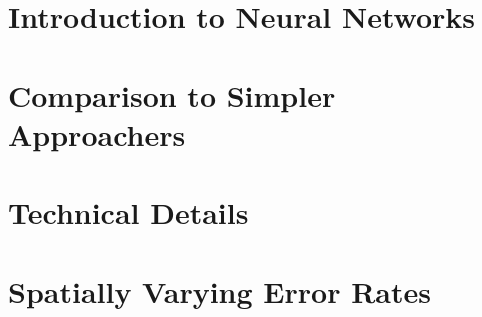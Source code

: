 \documentclass[twocolumn, nofootinbib]{revtex4-1}
\begin{document}
\section{Introduction to Neural Networks}
\label{appendix:intro_nn}


\section{Comparison to Simpler Approachers}
\label{appendix:simpler_approach}


\section{Technical Details}
\label{appendix:details}


\section{Spatially Varying Error Rates}
\label{appendix:varying_perror}

\end{document}
